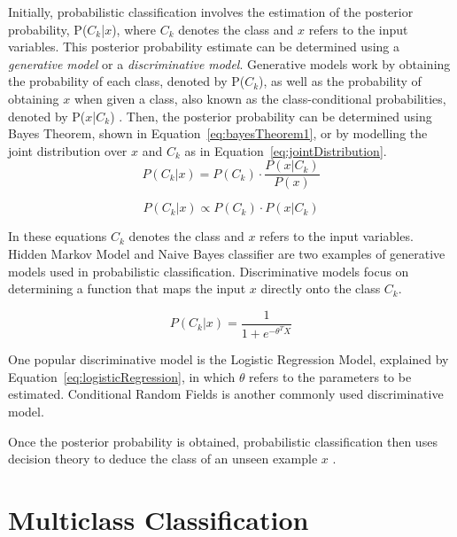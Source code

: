 Initially, probabilistic classification involves the estimation of the posterior probability, P($C_k$|$x$), where $C_k$ denotes the class and $x$ refers to the input variables. This posterior probability estimate can be determined using a \textit{generative model} or a \textit{discriminative model}. Generative models work by obtaining the probability of each class, denoted by P($C_k$), as well as the probability of obtaining $x$ when given a class, also known as the class-conditional probabilities, denoted by P($x$|$C_k$) \citep{aggarwal2014}. Then, the posterior probability can be determined using Bayes Theorem, shown in Equation~\ref{eq:bayesTheorem1}, or by modelling the joint distribution over $x$ and $C_k$ as in Equation~\ref{eq:jointDistribution}. 
\begin{equation}
    \label{eq:bayesTheorem1}
    P(C_k|x) = P(C_k)\cdot\frac{P(x|C_k)}{P(x)}
\end{equation}

\begin{equation}
    \label{eq:jointDistribution}
    P({C_k}|x) \propto P(C_k)\cdot P(x|C_k)
\end{equation}
\pagebreak[1]

In these equations $C_k$ denotes the class and $x$ refers to the input variables. Hidden Markov Model and Naive Bayes classifier are two examples of generative models used in probabilistic classification. Discriminative models focus on determining a function that maps the input $x$ directly onto the class $C_k$. 

\begin{equation}
    \label{eq:logisticRegression}
    P(C_k|x) = \frac{1}{1+e^{-\theta^{T}X}}
\end{equation}

One popular discriminative model is the Logistic Regression Model, explained by Equation~\ref{eq:logisticRegression}, in which $\theta$ refers to the parameters to be estimated. Conditional Random Fields is another commonly used discriminative model. 

Once the posterior probability is obtained, probabilistic classification then uses decision theory to deduce the class of an unseen example $x$ \citep{aggarwal2014}. 

\section{Multiclass Classification}
\label{sec:multiclass}


